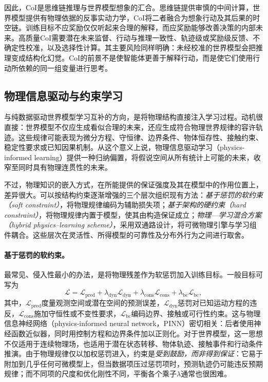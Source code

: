 因此，CoI是思维链推理与世界模型想象的汇合。思维链提供审慎的中间计算，世界模型提供有物理依据的反事实动力学，CoI将二者融合为想象行动及其后果的时空链。训练目标不应奖励仅仅听起来合理的解释，而应奖励能够改善决策的内部未来。高质量CoI需要潜在未来监督、行动与推理一致性、轨迹级或奖励级反馈、不确定性校准，以及选择性计算。其主要风险同样明确：未经校准的世界模型会把推理变成结构化幻觉。CoI的前景不是使智能体更善于解释行动，而是使它们使用行动所依赖的同一组变量进行思考。

\subsection{物理信息驱动与约束学习}
与纯数据驱动世界模型学习互补的方向，是将物理结构直接注入学习过程。动机很直接：世界模型不仅应生成看似合理的未来，还应生成符合物理世界规律的容许轨迹。这些规律可能表现为微分方程、守恒律、边界条件、物体恒存性、接触约束、稳定性要求或已知因果机制。从这个意义上说，物理信息驱动学习（physics-informed learning）提供一种归纳偏置，将假说空间从所有统计上可能的未来，收窄至同时具有物理连贯性的未来。

不过，物理知识的嵌入方式，在所能提供的保证强度及其在模型中的作用位置上，差异很大。可以按结构约束逐渐增强的三个层次组织现有方法：\emph{基于惩罚的软约束（soft constraint）}，将物理规律编码为辅助损失项；\emph{基于架构的硬约束（hard constraint）}，将物理规律内置于模型，使其由构造保证成立；\emph{物理—学习混合方案（hybrid physics--learning scheme）}，采用双通路设计，将可微物理引擎与学习组件耦合。这些层次在灵活性、所得模型的可靠性及分布外行为之间进行取舍。

\paragraph{基于惩罚的软约束。}
最常见、侵入性最小的办法，是将物理残差作为软惩罚加入训练目标。一般目标可写为
\begin{equation}
    \mathcal{L}
    =
    \mathcal{L}_{\mathrm{pred}}
    +
    \lambda_{\mathrm{dyn}}\mathcal{L}_{\mathrm{dyn}}
    +
    \lambda_{\mathrm{cons}}\mathcal{L}_{\mathrm{cons}}
    +
    \lambda_{\mathrm{bc}}\mathcal{L}_{\mathrm{bc}},
\end{equation}
其中，$\mathcal{L}_{\mathrm{pred}}$度量观测空间或潜在空间的预测误差，$\mathcal{L}_{\mathrm{dyn}}$惩罚对已知运动方程的违反，$\mathcal{L}_{\mathrm{cons}}$施加守恒性或不变性要求，$\mathcal{L}_{\mathrm{bc}}$编码边界、接触或可行性约束。这与物理信息神经网络（physics-informed neural network，PINN）密切相关：后者使用神经函数近似器，同时用控制方程和边界条件加以正则化\citep{raissi2019physics}。对于世界模型，这一思想不仅适用于连续物理场，也适用于潜在状态转移、物体轨迹、接触事件和行动条件推演。由于物理规律仅以加权惩罚进入，约束是\emph{受到鼓励，而非得到保证}：它易于附加到几乎任何可微模型上，但当数据项压过惩罚项时，预测轨迹仍可能违反预期规律；而不同项的尺度和优化刚性不同，平衡各个乘子$\lambda$通常也很困难。


